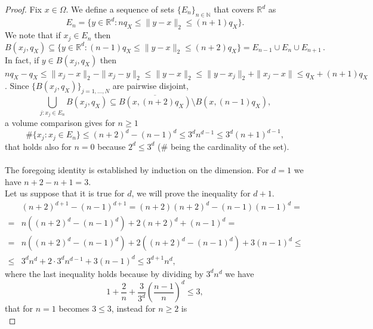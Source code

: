 \documentclass[10pt,a4paper]{amsart}
\begin{document}
\begin{proof}
Fix $x \in \Omega$. We define a sequence of sets $\{E_n\}_{n \in \mathbb{N}}$ that covers $\mathbb{R}^d$ as
\begin{equation*}
    E_n = \{ y \in \mathbb{R}^d: n q_X \leq \|y-x\|_2 \leq (n+1)q_X\}.
\end{equation*}
We note that if $x_j \in E_n$ then
\begin{equation*}
    B(x_j,q_X) \subseteq \{ y \in \mathbb{R}^d: (n-1)q_X \leq \|y-x\|_2 \leq (n+2)q_X\}=E_{n-1}\cup E_n \cup E_{n+1}\,.
\end{equation*}
In fact, if $y \in B(x_j,q_X)$ then $nq_X -q_X \leq \|x_j-x\|_2-\|x_j-y\|_2 \leq\|y-x\|_2 \leq \|y-x_j\|_2+\|x_j-x\| \leq q_X +(n+1)q_X$.
Since $\{B(x_j,q_X)\}_{j=1,\dots,N}$ are pairwise disjoint,
\begin{equation*}
    \bigcup_{j : x_j \in E_n} B(x_j,q_X) \subseteq \overline{B(x,(n+2)q_X)} \setminus B(x,(n-1)q_X),
\end{equation*}
a volume comparison gives for $n \geq 1$
\begin{equation*}
    \# \{x_j : x_j \in E_n\} \leq (n+2)^d-(n-1)^d \leq 3^d n^{d-1} \leq 3^d(n+1)^{d-1},
\end{equation*}
that holds also for $n=0$ because $2^d \leq 3^d$ ($\#$ being the cardinality of the set).
\\
\\
The foregoing identity is established by induction on the dimension. For $d=1$ we have $n+2-n+1=3$. 
\\ Let us suppose that it is true for $d$, we will prove the inequality for $d+1$.
\begin{equation*}
    \begin{split}
        &(n+2)^{d+1}-(n-1)^{d+1} = (n+2)(n+2)^d-(n-1)(n-1)^d = \\
        = & n((n+2)^d-(n-1)^d)+2(n+2)^d+(n-1)^d = \\
        = & n((n+2)^d-(n-1)^d) +2((n+2)^d-(n-1)^d)+3(n-1)^d \leq\\
        \leq & 3^dn^d+2 \cdot3^dn^{d-1}+3(n-1)^d \leq 3^{d+1}n^d,
    \end{split}
\end{equation*}
where the last inequality holds because by dividing by $3^dn^d$ we have
\begin{equation*}
    1+\frac{2}{n}+ \frac{3}{3^d}\left(\frac{n-1}{n}\right)^d \leq 3,
\end{equation*}
that for $n=1$ becomes $3 \leq 3$, instead for $n\geq 2$ is 
\begin{equation*}

\end{equation*}
\end{proof}
\end{document}
